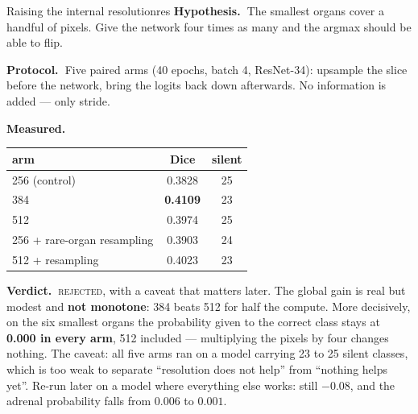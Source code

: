 \documentclass{article}
\newcommand{\hyp}{\textbf{Hypothesis.\ }}
\newcommand{\proto}{\textbf{Protocol.\ }}
\newcommand{\meas}{\textbf{Measured.\ }}
\newcommand{\verd}{\textbf{Verdict.\ }}
\newcommand{\rejected}{\textcolor{myred}{\textsc{rejected}}}
\begin{document}
\begin{expfail}{Raising the internal resolution}{res}
\hyp The smallest organs cover a handful of pixels. Give the network four times
as many and the argmax should be able to flip.

\proto Five paired arms (40 epochs, batch 4, ResNet-34): upsample the slice
before the network, bring the logits back down afterwards. No information is
added --- only stride.

\meas
\begin{center}
\begin{tabular}{lcc}
\hline
\textbf{arm} & \textbf{Dice} & \textbf{silent} \\
\hline
256 (control) & 0.3828 & 25 \\
384 & \textbf{0.4109} & 23 \\
512 & 0.3974 & 25 \\
256 + rare-organ resampling & 0.3903 & 24 \\
512 + resampling & 0.4023 & 23 \\
\hline
\end{tabular}
\end{center}

\verd \rejected, with a caveat that matters later. The global gain is real but
modest and \textbf{not monotone}: 384 beats 512 for half the compute. More
decisively, on the six smallest organs the probability given to the correct class
stays at \textbf{0.000 in every arm}, 512 included --- multiplying the pixels by
four changes nothing. The caveat: all five arms ran on a model carrying 23 to 25
silent classes, which is too weak to separate ``resolution does not help'' from
``nothing helps yet''. Re-run later on a model where everything else works: still
$-0.08$, and the adrenal probability falls from $0.006$ to $0.001$.
\end{expfail}
\end{document}
